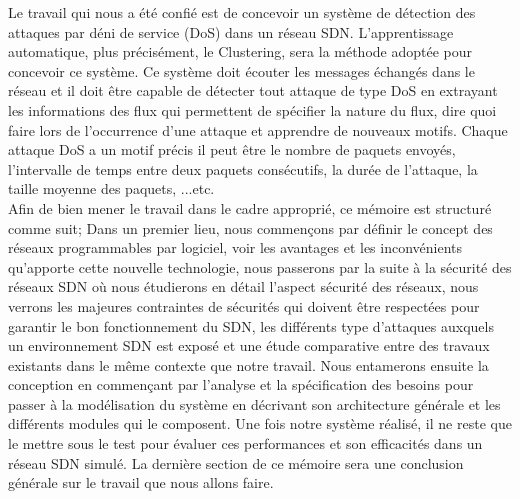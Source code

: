 	Le travail qui nous a été confié est de concevoir un système de détection des attaques par déni de service (DoS) dans un réseau SDN. L’apprentissage automatique, plus précisément, le Clustering, sera la méthode adoptée pour concevoir ce système. Ce système doit écouter les messages échangés dans le réseau et il doit être capable de détecter tout attaque de type DoS en extrayant les informations des flux qui permettent  de spécifier la nature du flux, dire quoi faire lors de l’occurrence d’une attaque et apprendre de nouveaux motifs. Chaque attaque DoS a un motif précis il peut être  le nombre de paquets envoyés, l’intervalle de temps entre deux paquets consécutifs, la durée de l’attaque, la taille moyenne des paquets, ...etc.\\
\newpage
Afin de bien mener le travail dans le cadre approprié, ce mémoire est structuré comme suit; Dans un premier lieu, nous commençons par définir le concept des réseaux programmables par logiciel, voir les avantages et les inconvénients qu'apporte cette nouvelle technologie, nous passerons par la suite à la sécurité des réseaux SDN où nous étudierons en détail l'aspect sécurité des réseaux, nous verrons les majeures contraintes de sécurités qui doivent être respectées pour garantir le bon fonctionnement du SDN, les différents type d’attaques auxquels un environnement SDN est exposé et une étude comparative entre des travaux existants dans le même contexte que notre travail. Nous entamerons ensuite la conception en commençant par l'analyse et la spécification des besoins pour passer à la modélisation du système en décrivant son architecture générale et les différents modules qui le composent. Une fois notre système réalisé, il ne reste que le mettre sous le test pour évaluer ces performances et son efficacités dans un réseau SDN simulé. La dernière section de ce mémoire sera une conclusion générale sur le travail que nous allons faire.\\
